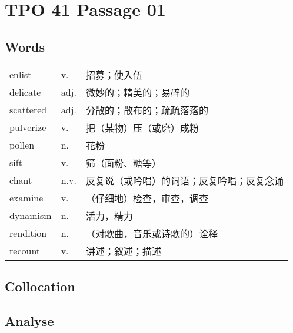 \section{TPO 41 Passage 01}

\subsection{Words}

\begin{tabular}{lll}
    enlist    & v.   & 招募；使入伍                \\
    delicate  & adj. & 微妙的；精美的；易碎的           \\
    scattered & adj. & 分散的；散布的；疏疏落落的         \\
    pulverize & v.   & 把（某物）压（或磨）成粉          \\
    pollen    & n.   & 花粉                    \\
    sift      & v.   & 筛（面粉、糖等）              \\
    chant     & n.v. & 反复说（或吟唱）的词语；反复吟唱；反复念诵 \\
    examine   & v.   & （仔细地）检查，审查，调查         \\
    dynamism  & n.   & 活力，精力                 \\
    rendition & n.   & （对歌曲，音乐或诗歌的）诠释        \\
    recount   & v.   & 讲述；叙述；描述              \\
\end{tabular}

\subsection{Collocation}


\subsection{Analyse}

